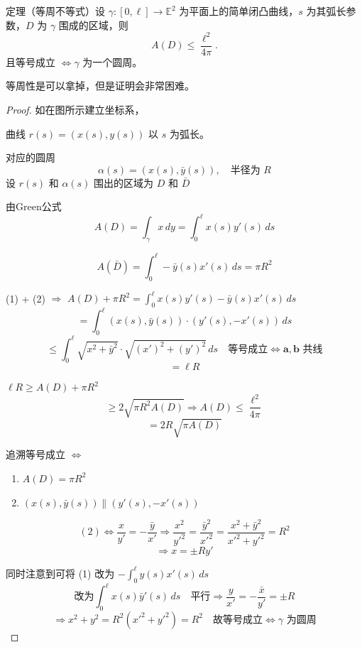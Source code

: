 \documentclass[lang=cn,10pt,thmcnt=section]{elegantbook}
\renewcommand{\vec}[1]{\mathbf{#1}}
\begin{document}
    \begin{theorem}\label{thm:isoperimetric}
        定理（等周不等式）设 $\gamma : [0, \ell] \rightarrow \mathbb{E}^2$ 为平面上的简单闭凸曲线，$s$ 为其弧长参数，$D$ 为 $\gamma$ 围成的区域，则
        \[
        A(D) \leq \frac{\ell^2}{4\pi}.
        \]
        且等号成立 $\iff \gamma$ 为一个圆周。
        
        \begin{remark}
            等周性是可以拿掉，但是证明会非常困难。
        \end{remark}
        \end{theorem}
\begin{proof}
    如在图所示建立坐标系，

曲线 $r(s) = (x(s), y(s))$ 以 $s$ 为弧长。

对应的圆周
\[
\alpha(s) = (x(s), \bar{y}(s)), \quad \text{半径为 } R
\]
设 $r(s)$ 和 $\alpha(s)$ 围出的区域为 $D$ 和 $\bar{D}$

由Green公式
\[
A(D) = \int_{\gamma} x \, dy = \int_0^{\ell} x(s) y'(s) \, ds \tag{1}
\]

\[
A(\bar{D}) = \int_0^{\ell} -\bar{y}(s) x'(s) \, ds = \pi R^2 \tag{2}
\]

(1) + (2) $\Rightarrow$ $A(D) + \pi R^2 = \int_0^{\ell} x(s) y'(s) - \bar{y}(s) x'(s) \, ds$
\[
= \int_0^{\ell} (x(s), \bar{y}(s)) \cdot (y'(s), -x'(s)) \, ds
\]
\[
\leq \int_0^{\ell} \sqrt{x^2 + \bar{y}^2} \cdot \sqrt{(x')^2 + (y')^2} \, ds \quad \text{等号成立} \Leftrightarrow \vec{a}, \vec{b} \text{ 共线}
\]
\[
= \ell R
\]

$\ell R \geq A(D) + \pi R^2$
\[
\geq 2 \sqrt{\pi R^2 A(D)} \Rightarrow A(D) \leq \frac{\ell^2}{4\pi}
\]
\[
= 2R \sqrt{\pi A(D)}
\]

追溯等号成立 $\Leftrightarrow$
\begin{enumerate}
    \item $A(D) = \pi R^2$
    \item $(x(s), \bar{y}(s)) \parallel (y'(s), -x'(s))$
\end{enumerate}

\[
(2) \Leftrightarrow \frac{x}{y'} = -\frac{\bar{y}}{x'} \Rightarrow \frac{x^2}{y'^2} = \frac{\bar{y}^2}{x'^2} = \frac{x^2 + \bar{y}^2}{x'^2 + y'^2} = R^2
\]
\[
\Rightarrow x = \pm R y'
\]

同时注意到可将 (1) 改为 $-\int_0^{\ell} y(s) x'(s) \, ds$
\[
\text{改为} \int_0^{\ell} x(s) \bar{y}'(s) \, ds \quad \text{平行} \Rightarrow \frac{y}{x'} = -\frac{\bar{x}}{y'} = \pm R
\]
\[
\Rightarrow x^2 + y^2 = R^2 (x'^2 + y'^2) = R^2 \quad \text{故等号成立} \Leftrightarrow \gamma \text{ 为圆周}
\]
\end{proof}   
\end{document}
